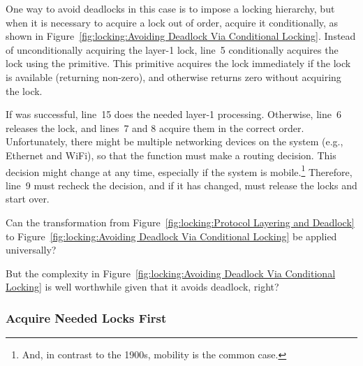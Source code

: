 One way to avoid deadlocks in this case is to impose a locking hierarchy,
but when it is necessary to acquire a lock out of order, acquire it
conditionally, as shown in
Figure~\ref{fig:locking:Avoiding Deadlock Via Conditional Locking}.
Instead of unconditionally acquiring the layer-1 lock, line~5
conditionally acquires the lock using the  primitive.
This primitive acquires the lock immediately if the lock is available
(returning non-zero), and otherwise returns zero without acquiring the lock.

If  was successful, line~15 does the needed
layer-1 processing.
Otherwise, line~6 releases the lock, and lines~7 and 8 acquire them in
the correct order.
Unfortunately, there might be multiple networking devices on
the system (e.g., Ethernet and WiFi), so that the 
function must make a routing decision.
This decision might change at any time, especially if the system
is mobile.\footnote{
	And, in contrast to the 1900s, mobility is the common case.}
Therefore, line~9 must recheck the decision, and if it has changed,
must release the locks and start over.

\QuickQuiz{}
	Can the transformation from
	Figure~\ref{fig:locking:Protocol Layering and Deadlock} to
	Figure~\ref{fig:locking:Avoiding Deadlock Via Conditional Locking}
	be applied universally?
 \QuickQuizEnd

\QuickQuiz{}
	But the complexity in
	Figure~\ref{fig:locking:Avoiding Deadlock Via Conditional Locking}
	is well worthwhile given that it avoids deadlock, right?
 \QuickQuizEnd

\subsubsection{Acquire Needed Locks First}
\label{sec:locking:Acquire Needed Locks First}

